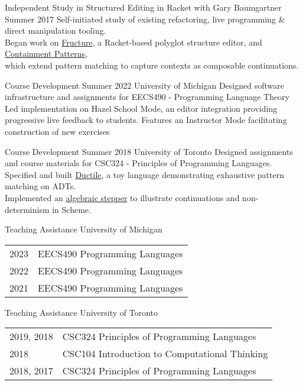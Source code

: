 \documentclass[10pt,a4paper]{article}
\begin{document}
  \headedsubsection
    {Independent Study in Structured Editing in Racket with Gary Baumgartner}
    {Summer 2017}
    {Self-initiated study of existing refactoring, live programming \& direct manipulation tooling.\\
    Began work on \href{https://github.com/disconcision/fructure}{Fructure}, a Racket-based polyglot structure editor, and \href{https://github.com/disconcision/containment-patterns}{Containment Patterns}, \\ which extend pattern matching to capture contexts as composable continuations.}


  \headedsubsection
    {Course Development}
    {Summer 2022 \sbull University of Michigan}
    {Designed software infrastructure and assignments for EECS490 -  Programming Language Theory \\
    Led implementation on Hazel School Mode, an editor integration  providing progressive live feedback to students. Features an Instructor Mode facilitating construction of new exercises}
    
  \headedsubsection
    {Course Development}
    {Summer 2018 \sbull University of Toronto}
    {Designed assignments and course materials for CSC324 - Principles of Programming Languages. \\
    Specified and built \href{https://github.com/disconcision/ductile}{Ductile}, a toy language demonstrating exhaustive pattern matching on ADTs. \\
    Implemented an \href{https://github.com/disconcision/racketlab/blob/master/choice-stepper.rkt}{algebraic stepper} to illustrate continuations and non-determinism in Scheme.}

  \headedsubsection
    {Teaching Assistance}
    {University of Michigan}
    {\begin{tabular}{p{2.3cm} l}
    2023 & EECS490 Programming Languages \\
    2022 & EECS490 Programming Languages \\
    2021 & EECS490 Programming Languages
    \end{tabular}}
    
  \headedsubsection
    {Teaching Assistance}
    {University of Toronto}
    {\begin{tabular}{p{2.3cm} l}
    2019, 2018 & CSC324 Principles of Programming Languages\\
    2018 & CSC104 Introduction to Computational Thinking \\
    2018, 2017 & CSC324 Principles of Programming Languages \\
    \end{tabular}}
  
\end{document}
